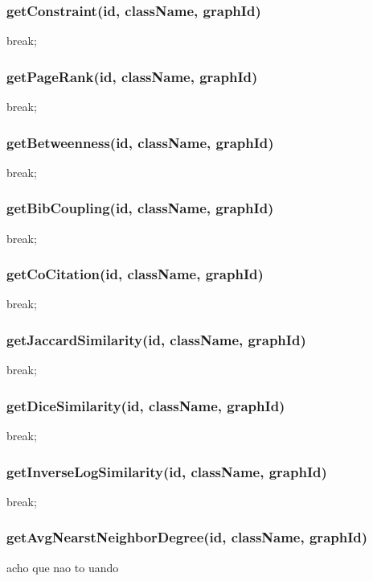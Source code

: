 \subsubsection{getConstraint(id, className, graphId)}
break;
\subsubsection{getPageRank(id, className, graphId)}
break;
\subsubsection{getBetweenness(id, className, graphId)}
break;
\subsubsection{getBibCoupling(id, className, graphId)}
break;
\subsubsection{getCoCitation(id, className, graphId)}
break;
\subsubsection{getJaccardSimilarity(id, className, graphId)}
break;
\subsubsection{getDiceSimilarity(id, className, graphId)}
break;
\subsubsection{getInverseLogSimilarity(id, className, graphId)}
break;
\subsubsection{getAvgNearstNeighborDegree(id, className, graphId)}
acho que nao to uando

